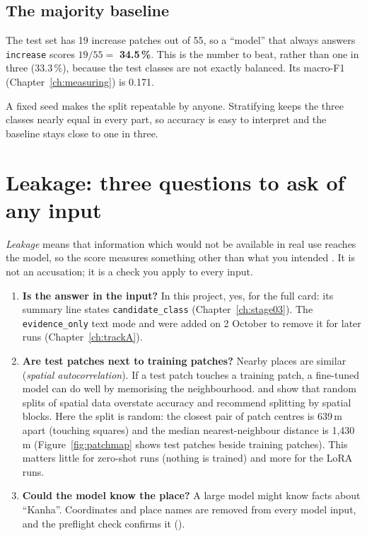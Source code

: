 \subsection{The majority baseline}

The test set has 19 increase patches out of 55, so a ``model'' that always answers \texttt{increase} scores $19/55 = $ \textbf{34.5\,\%}. This is the number to beat, rather than one in three (33.3\,\%), because the test classes are not exactly balanced. Its macro-F1 (Chapter~\ref{ch:measuring}) is 0.171.

\begin{whybox}
A fixed seed makes the split repeatable by anyone. Stratifying keeps the three classes nearly equal in every part, so accuracy is easy to interpret and the baseline stays close to one in three.
\end{whybox}

\section{Leakage: three questions to ask of any input}
\label{sec:leakage}

\begin{plainwords}
\emph{Leakage} means that information which would not be available in real use reaches the model, so the score measures something other than what you intended \citep{kaufman2012}. It is not an accusation; it is a check you apply to every input.
\end{plainwords}

\begin{enumerate}
  \item \textbf{Is the answer in the input?} In this project, yes, for the full card: its summary line states \texttt{candidate\_class} (Chapter~\ref{ch:stage03}). The \texttt{evidence\_only} text mode and  were added on 2 October to remove it for later runs (Chapter~\ref{ch:trackA}).
  \item \textbf{Are test patches next to training patches?} Nearby places are similar (\emph{spatial autocorrelation}). If a test patch touches a training patch, a fine-tuned model can do well by memorising the neighbourhood. \citet{roberts2017} and \citet{ploton2020} show that random splits of spatial data overstate accuracy and recommend splitting by spatial blocks. Here the split is random: the closest pair of patch centres is 639\,m apart (touching squares) and the median nearest-neighbour distance is 1,430\,m (Figure~\ref{fig:patchmap} shows test patches beside training patches). This matters little for zero-shot runs (nothing is trained) and more for the LoRA runs.
  \item \textbf{Could the model know the place?} A large model might know facts about ``Kanha''. Coordinates and place names are removed from every model input, and the preflight check confirms it ().
\end{enumerate}

